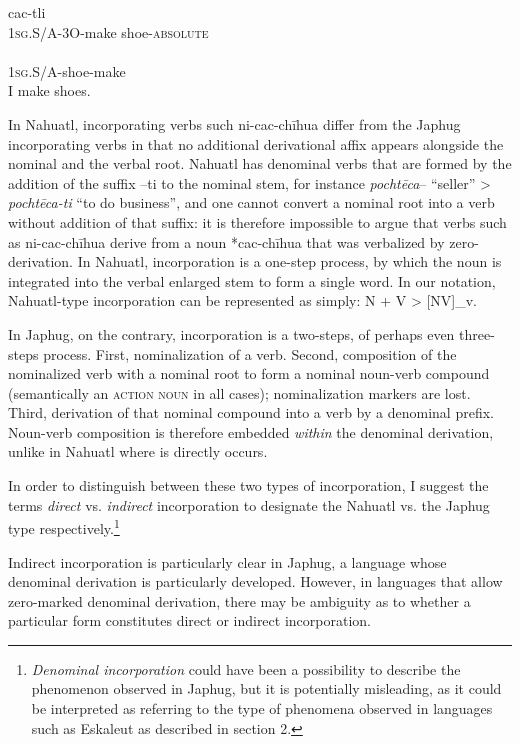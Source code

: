 \documentclass[oldfontcommands,oneside,a4paper,11pt]{article}
\newcommand{\ipa}[1]{{\phon #1}} %
\newcommand{\sg}{\textsc{sg}}
\begin{document}
  \begin{exe}
\ex
\gll     \ipa{ni-c-chīhua}   \ipa{cac-tli}  \\
1\sg{}.S/A-3O-make shoe-\textsc{absolute}  \\
  \ex
  \gll       \ipa{ni-cac-chīhua}  \\
1\sg{}.S/A-shoe-make  \\
 \glt  I make shoes.
\end{exe}  
In Nahuatl, incorporating verbs such  \ipa{ni-cac-chīhua} differ from the Japhug incorporating verbs in that no additional derivational affix appears alongside the nominal and the verbal root. Nahuatl has denominal verbs that are formed by the addition of the suffix --\ipa{ti} to the nominal stem, for instance \textit{pochtēca}-- ``seller'' > \textit{pochtēca-ti} ``to do business'', and one cannot convert a nominal root into a verb without addition of that suffix: it is therefore impossible to argue that verbs such as    \ipa{ni-cac-chīhua} derive from a noun *cac-chīhua that was verbalized by zero-derivation. In Nahuatl, incorporation is a one-step process, by which the noun is integrated into the verbal enlarged stem to form a single word. In our notation, Nahuatl-type incorporation can be represented as simply: N + V > [NV]_v.
 
In Japhug, on the contrary, incorporation is a two-steps, of perhaps even three-steps process. First, nominalization of a verb. Second, composition of the nominalized verb with a nominal root to form a nominal noun-verb compound (semantically an \textsc{action noun} in all cases); nominalization markers are lost. Third, derivation of that nominal compound into a verb by a denominal prefix. Noun-verb composition is therefore embedded \textit{within} the denominal derivation, unlike in Nahuatl where is directly occurs.
 
 In order to distinguish between these two types of incorporation, I suggest the terms \textit{direct} vs. \textit{indirect} incorporation to designate the Nahuatl vs. the Japhug type respectively.\footnote{\textit{Denominal incorporation} could have been a possibility to describe the phenomenon observed in Japhug, but it is potentially misleading, as it could be interpreted as referring to the type of phenomena observed in languages such as Eskaleut as described in section 2.} 
 
 Indirect incorporation is particularly clear in Japhug, a language whose denominal derivation is particularly developed. However, in languages that allow zero-marked denominal derivation, there may be ambiguity as to whether a particular form constitutes direct or indirect incorporation.
 
\end{document}
